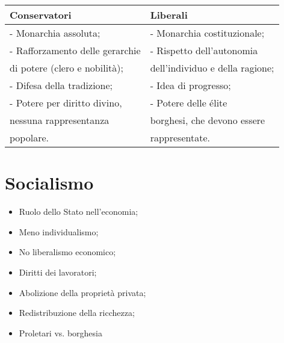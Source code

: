 \documentclass{article}
\begin{document}
\begin{table*}[ht!]
    \begin{center}
        \begin{tabular}{| m{5cm} | m{5cm} |}
            \hline \; \textbf{Conservatori} & \; \textbf{Liberali} \\
            \hline - Monarchia assoluta; & - Monarchia costituzionale; \\
            \hline - Rafforzamento delle gerarchie & - Rispetto dell'autonomia \\
                    \; di potere (clero e nobilità); & \; dell'individuo e della ragione; \\
            \hline - Difesa della tradizione; & - Idea di progresso; \\
            \hline - Potere per diritto divino, & - Potere delle élite \\
                    \; nessuna rappresentanza & \; borghesi, che devono essere \\
                    \; popolare. & \; rappresentate. \\
            \hline
        \end{tabular}
    \end{center}
\end{table*}

\section{Socialismo}
\begin{itemize}
    \item Ruolo dello Stato nell'economia;
    \item Meno individualismo;
    \item No liberalismo economico;
    \item Diritti dei lavoratori;
    \item Abolizione della proprietà privata;
    \item Redistribuzione della ricchezza;
    \item Proletari vs. borghesia 
\end{itemize}
\end{document}

